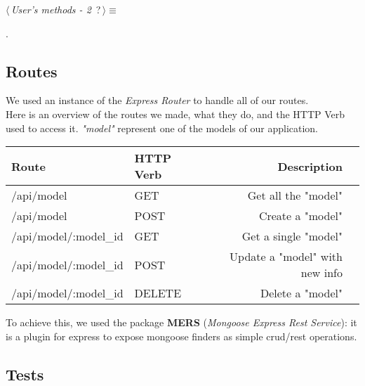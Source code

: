 \begin{flushleft} \small
\begin{minipage}{\linewidth}\label{scrap8}\raggedright\small
{} $\langle\,${\itshape {User's methods - 2}}\nobreak\ {\footnotesize {?}}$\,\rangle\equiv$
\vspace{-1ex}
\begin{list}{}{} \item

                
        {\NWsep}
\end{list}
\vspace{-1.5ex}
\footnotesize
\begin{list}{}{\setlength{\itemsep}{-\parsep}\setlength{\itemindent}{-\leftmargin}}
\item {\NWtxtMacroNoRef}.

\item{}
\end{list}
\end{minipage}\vspace{4ex}
\end{flushleft}
\subsection{Routes}

We used an instance of the \emph{Express Router} to handle all of our routes.
\\Here is an overview of the routes we made, what they do, and the HTTP Verb used to access it. \emph{"model"} represent one of the models of our application.

\vspace{5mm}

\begin{tabular}{|l|l|rl|}
\hline
Route          &		 HTTP Verb        &		 Description		&       \\
\hline
/api/model 		&	GET       &		Get all the "model"       &      	\\
/api/model		&	POST       & 	Create a "model"       &     		\\
/api/model/:model\_id 	&	GET       & 	Get a single "model"       &     	\\
/api/model/:model\_id		&	POST       & 	Update a "model" with new info       &     	\\
/api/model/:model\_id		&	DELETE       & 	Delete a "model"       &     	\\
\hline
\end{tabular}

\vspace{5mm}

To achieve this, we used the package \textbf{MERS} (\emph{Mongoose Express Rest Service}): it is a plugin for express to expose mongoose finders as simple crud/rest operations.

\subsection{Tests}